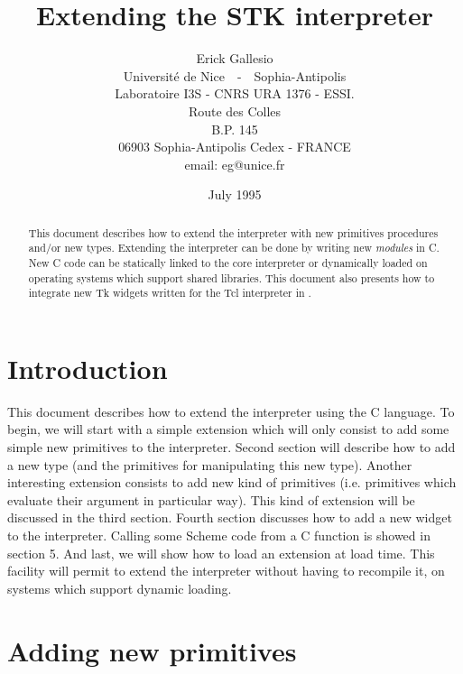 \documentclass[10pt]{article}
\begin{document}


\title{Extending the ST{\large\bf{K}} interpreter}
\author{Erick Gallesio \\
Universit\'e de Nice~~-~~Sophia-Antipolis \\
Laboratoire I3S - CNRS URA 1376 - ESSI. \\
Route des Colles\\
B.P. 145\\
06903 Sophia-Antipolis Cedex - FRANCE\\[3mm]
email: eg@unice.fr}
\date{July 1995}
\maketitle

\begin{abstract}
This document describes how to extend the {\stk} interpreter with new
primitives procedures and/or new types. Extending the interpreter can be done
by writing new {\em modules} in C. New C code can be statically linked to the
core interpreter or dynamically loaded on operating systems which support
shared libraries. This document also presents how to integrate new
Tk widgets written for the Tcl interpreter in {\stk}.
\end{abstract}


\pagebreak
\tableofcontents
\pagebreak
\section{Introduction}
This document describes how to extend the {\stk}\cite{Gallesio93-1}
interpreter using the C language\cite{Kernighan:CPL88}. To begin, we
will start with a simple extension which will only consist to add some
simple new primitives to the interpreter. Second section will describe
how to add a new type (and the primitives for manipulating this new
type). Another interesting extension consists to add new kind of
primitives (i.e.  primitives which evaluate their argument in
particular way). This kind of extension will be discussed in the third
section.  Fourth section discusses how to add a new widget to the
interpreter. Calling some Scheme code from a C function is showed in
section 5. And last, we will show how to load an extension at load
time. This facility will permit to extend the {\stk} interpreter
without having to recompile it, on systems which support dynamic
loading.

\section{Adding new primitives}
\end{document}
